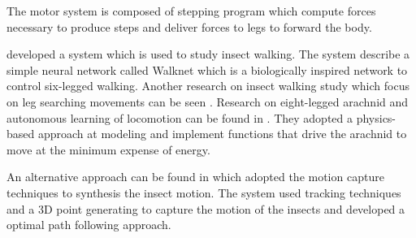 The motor system is composed of stepping program which compute forces
necessary to produce steps and deliver forces to legs to forward the body.


\cite{arsimu3} developed a system which is used to study insect
walking. The system describe a simple neural network called Walknet
which is a biologically inspired network to control six-legged
walking. Another research on insect walking study which focus on leg
searching movements can be seen \cite{arsimu6}.
Research on eight-legged arachnid and autonomous learning of
locomotion can be found in \cite{arsimu4}. They adopted a
physics-based approach at modeling and implement functions that drive the arachnid to move
at the minimum expense of energy.

An alternative approach can be found in \cite{arsimu5} which adopted the motion capture techniques to
synthesis the insect motion. The system used tracking techniques and a
3D point generating to capture the motion of the insects and developed a optimal path following approach.

